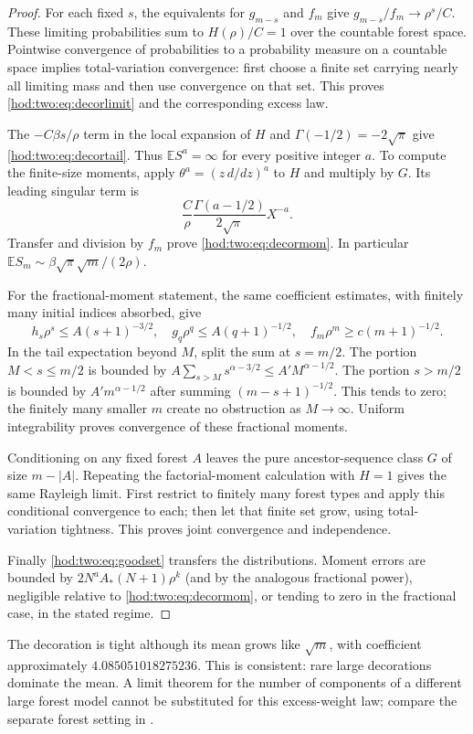 \documentclass[11pt,letterpaper]{article}
\theoremstyle{definition}\newtheorem{definition}[theorem]{Definition}
\theoremstyle{remark}\newtheorem{remark}[theorem]{Remark}
\newcommand{\Ee}{\mathbb E}
\begin{document}
\begin{proof}
For each fixed $s$, the equivalents for $g_{m-s}$ and $f_m$ give $g_{m-s}/f_m\to\rho^s/C$. These limiting probabilities sum to $H(\rho)/C=1$ over the countable forest space. Pointwise convergence of probabilities to a probability measure on a countable space implies total-variation convergence: first choose a finite set carrying nearly all limiting mass and then use convergence on that set. This proves \eqref{hod:two:eq:decorlimit} and the corresponding excess law.

The $-C\beta s/\rho$ term in the local expansion of $H$ and $\Gamma(-1/2)=-2\sqrt\pi$ give \eqref{hod:two:eq:decortail}. Thus $\Ee S^a=\infty$ for every positive integer $a$. To compute the finite-size moments, apply $\theta^a=(z\,d/dz)^a$ to $H$ and multiply by $G$. Its leading singular term is
\[
\frac C\rho\frac{\Gamma(a-1/2)}{2\sqrt\pi}X^{-a}.
\]
Transfer and division by $f_m$ prove \eqref{hod:two:eq:decormom}. In particular $\Ee S_m\sim\beta\sqrt\pi\sqrt m/(2\rho)$.

For the fractional-moment statement, the same coefficient estimates, with finitely many initial indices absorbed, give
\[
h_s\rho^s\le A(s+1)^{-3/2},\quad
g_q\rho^q\le A(q+1)^{-1/2},\quad
f_m\rho^m\ge c(m+1)^{-1/2}.
\]
In the tail expectation beyond $M$, split the sum at $s=m/2$. The portion $M<s\le m/2$ is bounded by $A\sum_{s>M}s^{\alpha-3/2}\le A'M^{\alpha-1/2}$. The portion $s>m/2$ is bounded by $A'm^{\alpha-1/2}$ after summing $(m-s+1)^{-1/2}$. This tends to zero; the finitely many smaller $m$ create no obstruction as $M\to\infty$. Uniform integrability proves convergence of these fractional moments.

Conditioning on any fixed forest $A$ leaves the pure ancestor-sequence class $G$ of size $m-|A|$. Repeating the factorial-moment calculation with $H=1$ gives the same Rayleigh limit. First restrict to finitely many forest types and apply this conditional convergence to each; then let that finite set grow, using total-variation tightness. This proves joint convergence and independence.

Finally \eqref{hod:two:eq:goodset} transfers the distributions. Moment errors are bounded by $2N^aA_*(N+1)\rho^k$ (and by the analogous fractional power), negligible relative to \eqref{hod:two:eq:decormom}, or tending to zero in the fractional case, in the stated regime.
\end{proof}
The decoration is tight although its mean grows like $\sqrt m$, with coefficient approximately $4.085051018275236$. This is consistent: rare large decorations dominate the mean. A limit theorem for the number of components of a different large forest model cannot be substituted for this excess-weight law; compare the separate forest setting in \cite{forest}.
\end{document}
